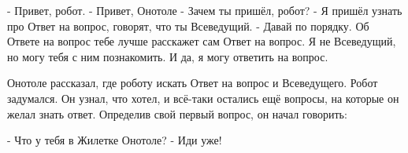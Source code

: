 - Привет, робот.
- Привет, Онотоле
- Зачем ты пришёл, робот?
- Я пришёл узнать про Ответ на вопрос, говорят, что ты Всеведущий.
- Давай по порядку. Об Ответе на вопрос тебе лучше расскажет сам Ответ на вопрос. Я не Всеведущий, но могу тебя с ним познакомить. И да, я могу ответить на вопрос.

Онотоле рассказал, где роботу искать Ответ на вопрос и Всеведущего. Робот задумался. Он узнал, что хотел, и всё-таки остались ещё вопросы, на которые он желал знать ответ. Определив свой первый вопрос, он начал говорить:

- Что у тебя в Жилетке Онотоле?
- Иди уже!